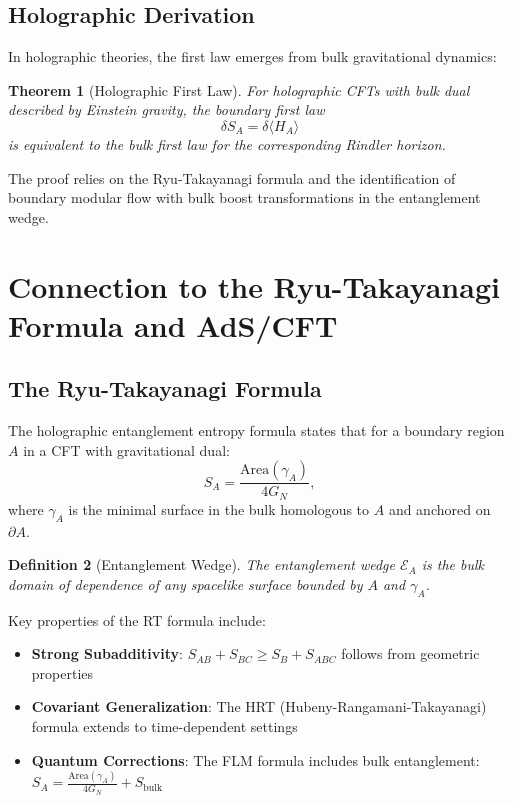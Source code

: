 \documentclass[11pt,letterpaper]{article}
\newtheorem{theorem}{Theorem}[section]
\newtheorem{definition}[theorem]{Definition}
\begin{document}
\subsection{Holographic Derivation}

In holographic theories, the first law emerges from bulk gravitational dynamics:

\begin{theorem}[Holographic First Law]
For holographic CFTs with bulk dual described by Einstein gravity, the boundary first law
\begin{equation}
\delta S_A = \delta\langle H_A\rangle
\end{equation}
is equivalent to the bulk first law for the corresponding Rindler horizon.
\end{theorem}

The proof relies on the Ryu-Takayanagi formula and the identification of boundary modular flow with bulk boost transformations in the entanglement wedge.

\section{Connection to the Ryu-Takayanagi Formula and AdS/CFT}

\subsection{The Ryu-Takayanagi Formula}

The holographic entanglement entropy formula states that for a boundary region $A$ in a CFT with gravitational dual:
\begin{equation}
S_A = \frac{\text{Area}(\gamma_A)}{4G_N},
\label{eq:RT}
\end{equation}
where $\gamma_A$ is the minimal surface in the bulk homologous to $A$ and anchored on $\partial A$.

\begin{definition}[Entanglement Wedge]
The entanglement wedge $\mathcal{E}_A$ is the bulk domain of dependence of any spacelike surface bounded by $A$ and $\gamma_A$.
\end{definition}

Key properties of the RT formula include:
\begin{itemize}
\item \textbf{Strong Subadditivity}: $S_{AB} + S_{BC} \geq S_B + S_{ABC}$ follows from geometric properties
\item \textbf{Covariant Generalization}: The HRT (Hubeny-Rangamani-Takayanagi) formula extends to time-dependent settings
\item \textbf{Quantum Corrections}: The FLM formula includes bulk entanglement: $S_A = \frac{\text{Area}(\gamma_A)}{4G_N} + S_{\text{bulk}}$
\end{itemize}
\end{document}
